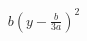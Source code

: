 \documentclass[preview]{standalone}
\begin{document}
\begin{align*}
b\left(y-\frac{b}{3a}\right)^2
\end{align*}
\end{document}
